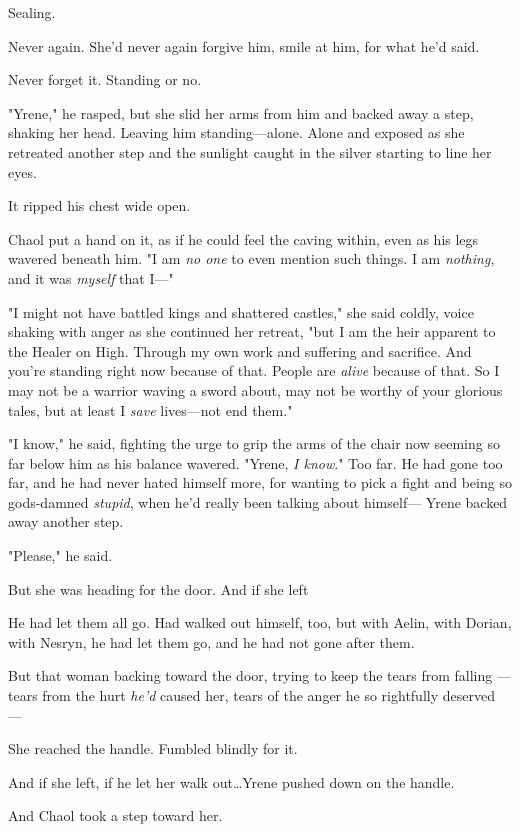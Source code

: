Sealing.

Never again.
She'd never again forgive him, smile at him, for what he'd said.

Never forget it.
Standing or no.

"Yrene," he rasped, but she slid her arms from him and backed away a step, shaking her head.
Leaving him standing---alone.
Alone and exposed as she retreated another step and the sunlight caught in the silver starting to line her eyes.

It ripped his chest wide open.

Chaol put a hand on it, as if he could feel the caving within, even as his legs wavered beneath him.
"I am \emph{no one} to even mention such things.
I am \emph{nothing}, and it was \emph{myself} that I---"

"I might not have battled kings and shattered castles," she said coldly, voice shaking with anger as she continued her retreat, "but I am the heir apparent to the Healer on High.
Through my own work and suffering and sacrifice.
And you're standing right now because of that.
People are \emph{alive} because of that.
So I may not be a warrior waving a sword about, may not be worthy of your glorious tales, but at least I \emph{save} lives---not end them."

"I know," he said, fighting the urge to grip the arms of the chair now seeming so far below him as his balance wavered.
"Yrene, \emph{I know}."
Too far.
He had gone too far, and he had never hated himself more, for wanting to pick a fight and being so gods-damned \emph{stupid}, when he'd really been talking about himself--- Yrene backed away another step.

"Please," he said.

But she was heading for the door.
And if she left 

He had let them all go.
Had walked out himself, too, but with Aelin, with Dorian, with Nesryn, he had let them go, and he had not gone after them.

But that woman backing toward the door, trying to keep the tears from falling ---tears from the hurt \emph{he'd} caused her, tears of the anger he so rightfully deserved ---

She reached the handle.
Fumbled blindly for it.

And if she left, if he let her walk out\ldots Yrene pushed down on the handle.

And Chaol took a step toward her.


